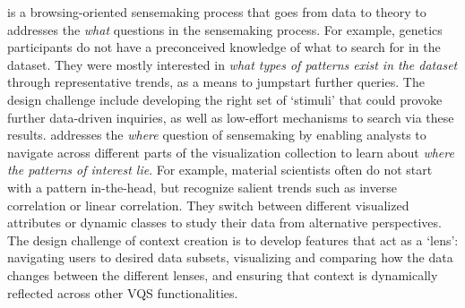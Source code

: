  is 
a browsing-oriented sensemaking process 
that goes from data to theory to 
addresses the \textit{what} questions 
in the sensemaking process.
 For example, genetics participants do not 
 have a preconceived knowledge of what to search 
 for in the dataset. 
 They were mostly interested in 
 \textit{what types of patterns exist in the dataset} 
 through representative trends, as a means to 
 jumpstart further queries. %
The design challenge include developing 
the right set of `stimuli' that could 
provoke further data-driven inquiries, 
as well as low-effort mechanisms to search via these results.
 addresses the \textit{where} 
question of sensemaking by enabling analysts 
to navigate across different parts of the visualization 
collection to learn about \textit{where the patterns of interest lie}. 
For example, material scientists often do not start 
with a pattern in-the-head, but recognize salient 
trends such as inverse correlation or linear correlation. 
They switch between different visualized attributes or dynamic 
classes to study their data from alternative perspectives. 
The design challenge of context creation is to develop 
features that act as a `lens': navigating users to desired data subsets, 
visualizing and comparing how the data changes between the different lenses, and ensuring that context is dynamically reflected across other VQS functionalities.
\par\noindent{}
